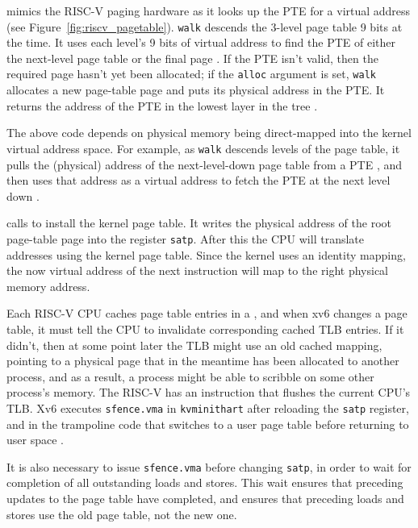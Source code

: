 mimics the RISC-V paging hardware as it
looks up the PTE for a virtual address (see
Figure~\ref{fig:riscv_pagetable}).
\lstinline{walk}
descends the 3-level page table 9 bits at the time.
It uses each level's 9 bits of virtual address to find
the PTE of either the next-level page table or the final page
.
If the PTE isn't valid, then
the required page hasn't yet been allocated;
if the
\lstinline{alloc}
argument is set,
\lstinline{walk}
allocates a new page-table page and puts its physical address in the PTE.
It returns the address of the PTE in the lowest layer in the tree
.

The above code depends on physical memory being direct-mapped into the
kernel virtual address space. For example, as \lstinline{walk} descends levels
of the page table, it pulls the (physical) address of the
next-level-down page table from a PTE ,
and then uses that address as a
virtual address to fetch the PTE at the next level down
.

calls
to install the kernel page table.
It writes the physical address of the root page-table page
into the register
\texttt{satp}.
After this the CPU will translate addresses using the kernel
page table.  Since the kernel uses an identity mapping, the now
virtual address of the next instruction will map to the right physical
memory address.

Each RISC-V CPU caches page table entries in a
, and when xv6 changes
a page table, it must tell the CPU to invalidate corresponding
cached TLB entries.  If it didn't,
then at some point later the TLB might
use an old cached mapping, pointing to a physical page that in the meantime
has been allocated to another process, and as a result, a process
might be able to scribble on some other process's memory.  The RISC-V
has an instruction  that flushes
the current CPU's TLB.
Xv6 executes {\tt sfence.vma} in {\tt kvminithart}  after reloading the 
\texttt{satp} register, and in the trampoline code that
switches to a user page table before returning to user space
.

It is also necessary to issue \texttt{sfence.vma} before changing
\texttt{satp}, in order to wait for completion of all outstanding loads and
stores. This wait ensures that preceding updates to the page table have
completed, and ensures that preceding loads and stores use the old
page table, not the new one.

